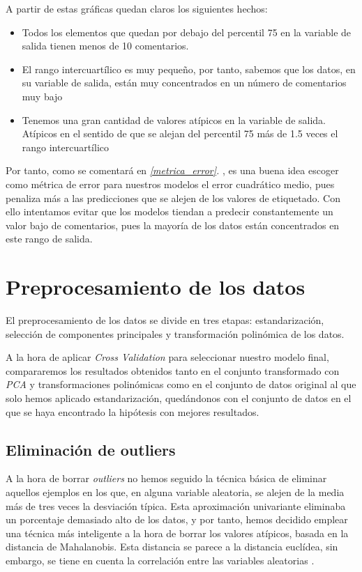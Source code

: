 \documentclass[11pt]{article}
\begin{document}
A partir de estas gráficas quedan claros los siguientes hechos:

\begin{itemize}
  \item Todos los elementos que quedan por debajo del percentil 75 en la variable de salida tienen menos de 10 comentarios.
  \item El rango intercuartílico es muy pequeño, por tanto, sabemos que los datos, en su variable de salida, están muy concentrados en un número de comentarios muy bajo
  \item Tenemos una gran cantidad de valores atípicos en la variable de salida. Atípicos en el sentido de que se alejan del percentil 75 más de 1.5 veces el rango intercuartílico
\end{itemize}

Por tanto, como se comentará en \emph{\ref{metrica_error}. }, es una buena idea escoger como métrica de error para nuestros modelos el error cuadrático medio, pues penaliza más a las predicciones que se alejen de los valores de etiquetado. Con ello intentamos evitar que los modelos tiendan a predecir constantemente un valor bajo de comentarios, pues la mayoría de los datos están concentrados en este rango de salida.
\pagebreak

\section{Preprocesamiento de los datos} \label{preprocesado}

El preprocesamiento de los datos se divide en tres etapas: estandarización, selección de componentes principales y transformación polinómica de los datos.

A la hora de aplicar \emph{Cross Validation} para seleccionar nuestro modelo final, compararemos los resultados obtenidos tanto en el conjunto transformado con \emph{PCA} y transformaciones polinómicas como en el conjunto de datos original al que solo hemos aplicado estandarización, quedándonos con el conjunto de datos en el que se haya encontrado la hipótesis con mejores resultados.

\subsection{Eliminación de outliers}

A la hora de borrar \emph{outliers} no hemos seguido la técnica básica de eliminar aquellos ejemplos en los que, en alguna variable aleatoria, se alejen de la media más de tres veces la desviación típica. Esta aproximación univariante eliminaba un porcentaje demasiado alto de los datos, y por tanto, hemos decidido emplear una técnica más inteligente a la hora de borrar los valores atípicos, basada en la distancia de Mahalanobis. Esta distancia se parece a la distancia euclídea, sin embargo, se tiene en cuenta la correlación entre las variables aleatorias \cite{wiki_mahalanobis:online}.
\end{document}
